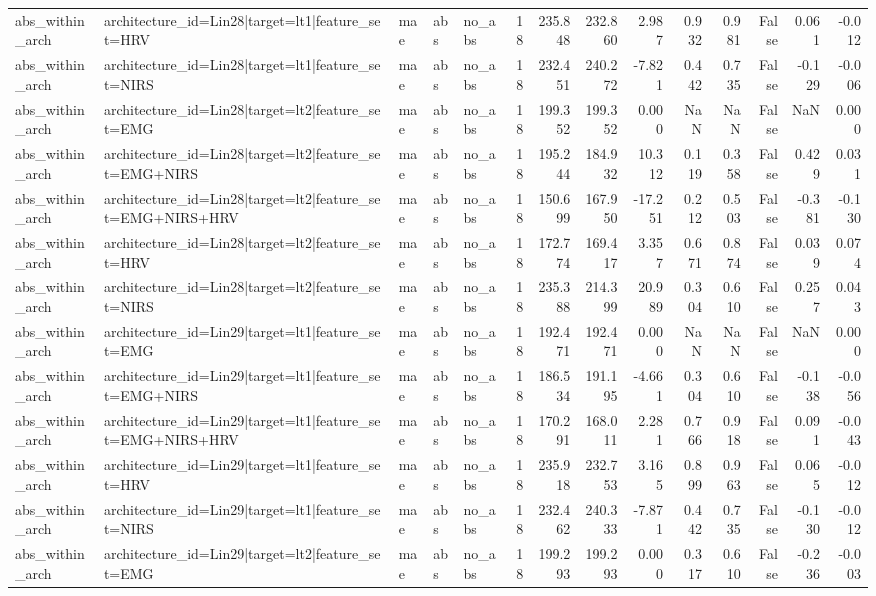 \begin{table}
\begin{tabular}{lllllrrrrrrrrr}
abs_within_arch & architecture_id=Lin28|target=lt1|feature_set=HRV & mae & abs & no_abs & 18 & 235.848 & 232.860 & 2.987 & 0.932 & 0.981 & False & 0.061 & -0.012 \\
abs_within_arch & architecture_id=Lin28|target=lt1|feature_set=NIRS & mae & abs & no_abs & 18 & 232.451 & 240.272 & -7.821 & 0.442 & 0.735 & False & -0.129 & -0.006 \\
abs_within_arch & architecture_id=Lin28|target=lt2|feature_set=EMG & mae & abs & no_abs & 18 & 199.352 & 199.352 & 0.000 & NaN & NaN & False & NaN & 0.000 \\
abs_within_arch & architecture_id=Lin28|target=lt2|feature_set=EMG+NIRS & mae & abs & no_abs & 18 & 195.244 & 184.932 & 10.312 & 0.119 & 0.358 & False & 0.429 & 0.031 \\
abs_within_arch & architecture_id=Lin28|target=lt2|feature_set=EMG+NIRS+HRV & mae & abs & no_abs & 18 & 150.699 & 167.950 & -17.251 & 0.212 & 0.503 & False & -0.381 & -0.130 \\
abs_within_arch & architecture_id=Lin28|target=lt2|feature_set=HRV & mae & abs & no_abs & 18 & 172.774 & 169.417 & 3.357 & 0.671 & 0.874 & False & 0.039 & 0.074 \\
abs_within_arch & architecture_id=Lin28|target=lt2|feature_set=NIRS & mae & abs & no_abs & 18 & 235.388 & 214.399 & 20.989 & 0.304 & 0.610 & False & 0.257 & 0.043 \\
abs_within_arch & architecture_id=Lin29|target=lt1|feature_set=EMG & mae & abs & no_abs & 18 & 192.471 & 192.471 & 0.000 & NaN & NaN & False & NaN & 0.000 \\
abs_within_arch & architecture_id=Lin29|target=lt1|feature_set=EMG+NIRS & mae & abs & no_abs & 18 & 186.534 & 191.195 & -4.661 & 0.304 & 0.610 & False & -0.138 & -0.056 \\
abs_within_arch & architecture_id=Lin29|target=lt1|feature_set=EMG+NIRS+HRV & mae & abs & no_abs & 18 & 170.291 & 168.011 & 2.281 & 0.766 & 0.918 & False & 0.091 & -0.043 \\
abs_within_arch & architecture_id=Lin29|target=lt1|feature_set=HRV & mae & abs & no_abs & 18 & 235.918 & 232.753 & 3.165 & 0.899 & 0.963 & False & 0.065 & -0.012 \\
abs_within_arch & architecture_id=Lin29|target=lt1|feature_set=NIRS & mae & abs & no_abs & 18 & 232.462 & 240.333 & -7.871 & 0.442 & 0.735 & False & -0.130 & -0.012 \\
abs_within_arch & architecture_id=Lin29|target=lt2|feature_set=EMG & mae & abs & no_abs & 18 & 199.293 & 199.293 & 0.000 & 0.317 & 0.610 & False & -0.236 & -0.003 \\

\end{tabular}
\end{table}
